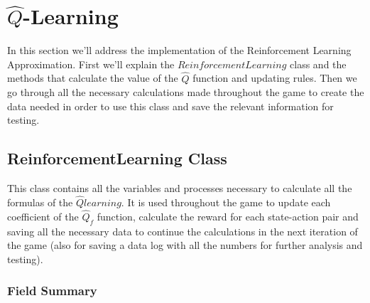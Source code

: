 \newpage

\section{$ \hat{Q}$-Learning}

In this section we'll address the implementation of the Reinforcement Learning Approximation. First we'll explain the $ReinforcementLearning$ class and the methods that calculate the value of the $\hat{Q}$ function and updating rules. Then we go through all the necessary calculations made throughout the game to create the data needed in order to use this class and save the relevant information for testing.\nolinebreak

\subsection{ReinforcementLearning Class}

This class contains all the variables and processes necessary to calculate all the formulas of the $\hat{Q} learning$. It is used throughout the game to update each coefficient of the $\hat{Q}_f$ function, calculate the reward for each state-action pair and saving all the necessary data to continue the calculations in the next iteration of the game (also for saving a data log with all the numbers for further analysis and testing).

\subsubsection{Field Summary}

